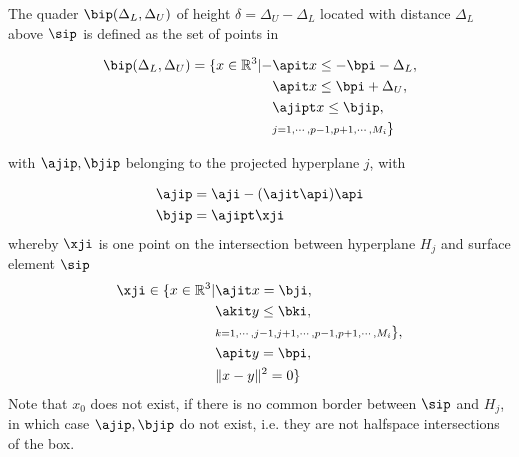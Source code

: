 \documentclass{article}
\def\R{\ensuremath{\mathbb{R}}}
\begin{document}
\begin{definition}
        The quader $\bip(\Delta_L, \Delta_U)$ of height $\delta=\Delta_U-\Delta_L$ located
        with distance $\Delta_L$ above $\sip$ is defined as the set of points in

        \begin{equation}
                \begin{aligned}
                        \bip(\Delta_L, \Delta_U) = \{ x\in \R^3| -&\apit x \leq -\bpi-\Delta_L, \\
                                       &\apit x \leq \bpi + \Delta_U, \\
                                        &\ajipt x \leq \bjip,\\
                                        &{\scriptstyle j=1,\cdots,p-1,p+1,\cdots,M_i}\}
                \end{aligned}
        \end{equation}

        with $\ajip,\bjip$ belonging to the projected hyperplane $j$, with 
        
        \begin{equation}
                \begin{aligned}
                        \ajip &= \aji - (\ajit \api)\api\\
                        \bjip &= \ajipt \xji
                \end{aligned}
        \end{equation}
        whereby $\xji$ is one point on the intersection between hyperplane $H_j$
        and surface element $\sip$
        \begin{equation}
                \begin{aligned}
                        \xji \in \{x\in \R^3| &\ajit x = \bji, \\
                            &\akit y \leq \bki, \\
                            &{\scriptstyle k=1,\cdots,j-1,j+1,\cdots,p-1,p+1,\cdots,M_i}\}, \\
                            &\apit y = \bpi,\\
                            &\| x-y \|^2 = 0\}
                \end{aligned}
        \end{equation}
        Note that $x_0$ does not exist, if there is no common border between $\sip$ and
        $H_j$, in which case $\ajip,\bjip$ do not exist, i.e. they are not
        halfspace intersections of the box.
\end{definition}



 
\end{document}
